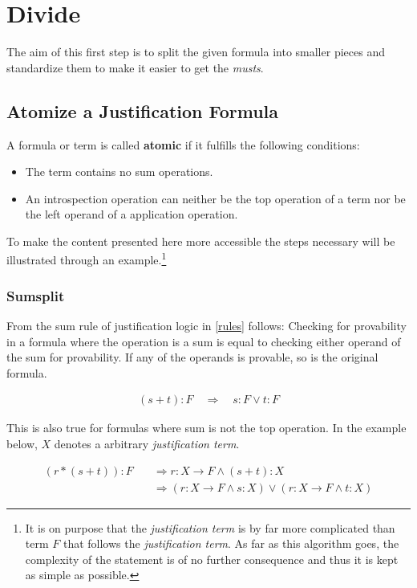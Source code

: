 \section{Divide}\label{chap:Algorithm.divide}
The aim of this first step is to split the given formula into smaller pieces and standardize them to make it easier to get the \emph{musts}.

\subsection{Atomize a Justification Formula}\label{chap:Algorithm.atomize}
\begin{definition}[atomic]
	A formula or term is called \textbf{atomic} if it fulfills the following conditions:
	\begin{itemize}
		\item The term contains no sum operations.
		\item An introspection operation can neither be the top operation of a term nor be the left operand of a application operation.
	\end{itemize}	
\end{definition}
To make the content presented here more accessible the steps necessary will be illustrated through an example.\footnote{It is on purpose that the \emph{justification term} is by far more complicated than term $F$ that follows the \emph{justification term}. As far as this algorithm goes, the complexity of the statement is of no further consequence and thus it is kept as simple as possible.}

\subsubsection{Sumsplit}
\label{sumsplit}
From the sum rule of justification logic in \ref{rules} follows: Checking for provability in a formula where the operation is a sum is equal to checking either operand of the sum for provability. If any of the operands is provable, so is the original formula.

\begin{align}\label{ss1}
	(s+t):F \quad \Rightarrow \quad s:F \lor t:F
\end{align}



This is also true for formulas where sum is not the top operation. In the example below, $X$ denotes a arbitrary \emph{justification term}.

\begin{align}\label{ss2}
	(r*(s+t)):F  \quad & \Rightarrow r: X \rightarrow F \land (s+t): X \\
	& \Rightarrow ( r: X \rightarrow F \land s: X ) \lor ( r: X \rightarrow F \land t: X )
\end{align}

